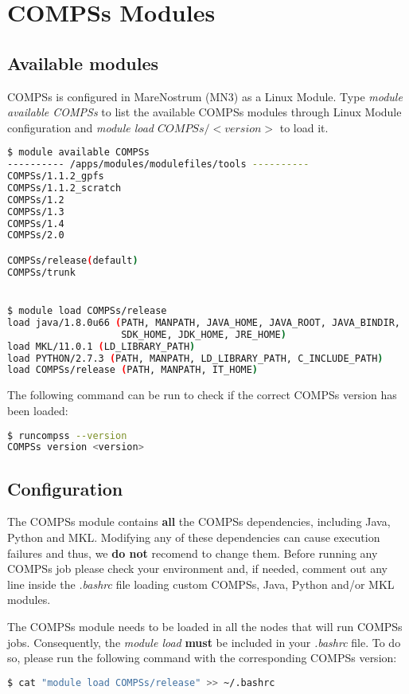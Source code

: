 \section{COMPSs Modules}
\label{sec:Modules}


\subsection{Available modules}
COMPSs is configured in MareNostrum (MN3) as a Linux Module. Type \textit{module available COMPSs} to list the available COMPSs modules 
through Linux Module configuration and \textit{module load $COMPSs/<version>$} to load it.
\begin{lstlisting}[language=bash]
$ module available COMPSs
---------- /apps/modules/modulefiles/tools ----------
COMPSs/1.1.2_gpfs
COMPSs/1.1.2_scratch
COMPSs/1.2
COMPSs/1.3
COMPSs/1.4
COMPSs/2.0

COMPSs/release(default)
COMPSs/trunk


$ module load COMPSs/release
load java/1.8.0u66 (PATH, MANPATH, JAVA_HOME, JAVA_ROOT, JAVA_BINDIR,
                    SDK_HOME, JDK_HOME, JRE_HOME)
load MKL/11.0.1 (LD_LIBRARY_PATH)
load PYTHON/2.7.3 (PATH, MANPATH, LD_LIBRARY_PATH, C_INCLUDE_PATH)
load COMPSs/release (PATH, MANPATH, IT_HOME)
\end{lstlisting}

The following command can be run to check if the correct COMPSs version has been loaded:
\begin{lstlisting}[language=bash]
$ runcompss --version
COMPSs version <version>

\end{lstlisting}

\subsection{Configuration}
The COMPSs module contains \textbf{all} the COMPSs dependencies, including Java, Python and MKL. Modifying any of these dependencies
can cause execution failures and thus, we \textbf{do not} recomend to change them. Before running any COMPSs job please check your 
environment and, if needed, comment out any line inside the \textit{.bashrc} file loading custom COMPSs, Java, Python and/or MKL
modules.

The COMPSs module needs to be loaded in all the nodes that will run COMPSs jobs. Consequently, the \textit{module load} \textbf{must}
be included in your \textit{.bashrc} file. To do so, please run the following command with the corresponding COMPSs version:
\begin{lstlisting}[language=bash]
$ cat "module load COMPSs/release" >> ~/.bashrc
\end{lstlisting}

